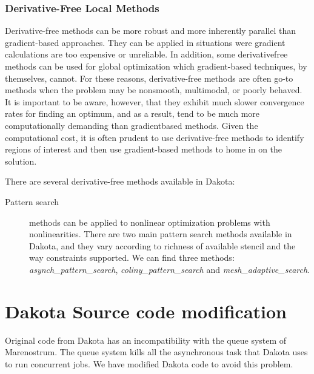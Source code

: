\documentclass[12pt,a4paper,article]{memoir}
\begin{document}
\subsection{Derivative-Free Local Methods}

Derivative-free methods can be more robust and more inherently parallel than gradient-based approaches. They can be applied in situations were gradient calculations are too expensive or unreliable. In addition, some derivativefree methods can be used for global optimization which gradient-based techniques, by themselves, cannot. For these reasons, derivative-free methods are often go-to methods when the problem may be nonsmooth, multimodal, or poorly behaved. It is important to be aware, however, that they exhibit much slower convergence rates for finding an optimum, and as a result, tend to be much more computationally demanding than gradientbased methods. Given the computational cost, it is often prudent to use derivative-free methods to identify regions of interest and then use gradient-based methods to home in on the solution.

There are several derivative-free methods available in Dakota:

\begin{description}
\item[Pattern search] methods can be applied to nonlinear optimization problems with nonlinearities. There are two main pattern search methods available in Dakota, and they vary according to richness of available stencil and the way constraints supported. We can find three methods: \textit{asynch\_pattern\_search}, \textit{coliny\_pattern\_search} and \textit{mesh\_adaptive\_search}.


\end{description}













\appendix

\chapter{Dakota Source code modification}
\label{chapter:CodeMod}

Original code from Dakota has an incompatibility with the queue system of Marenostrum. The queue system kills all the asynchronous task that Dakota uses to run concurrent jobs. We have modified Dakota code to avoid this problem.
\end{document}

